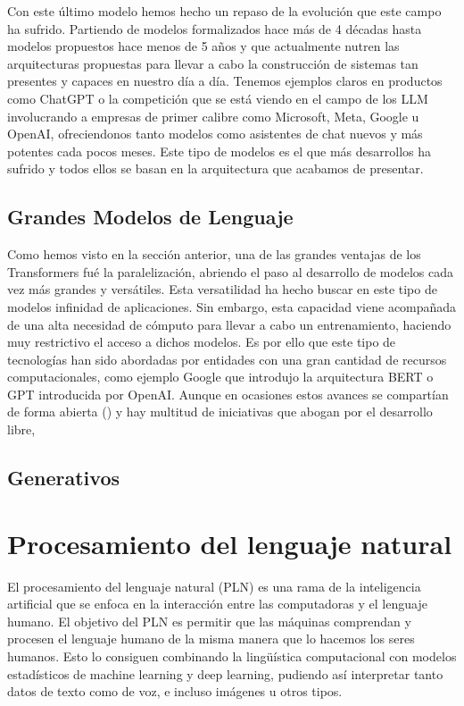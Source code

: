 Con este último modelo hemos hecho un repaso de la evolución que este campo ha sufrido. Partiendo de modelos formalizados hace más de 4 décadas hasta modelos propuestos hace menos de 5 años y que actualmente nutren las arquitecturas propuestas para llevar a cabo la construcción de sistemas tan presentes y capaces en nuestro día a día. Tenemos ejemplos claros en productos como ChatGPT o la competición que se está viendo en el campo de los LLM involucrando a empresas de primer calibre como Microsoft, Meta, Google u OpenAI, ofreciendonos tanto modelos como asistentes de chat nuevos y más potentes cada pocos meses. Este tipo de modelos es el que más desarrollos ha sufrido y todos ellos se basan en la arquitectura que acabamos de presentar.

\subsection{Grandes Modelos de Lenguaje}

Como hemos visto en la sección anterior, una de las grandes ventajas de los Transformers fué la paralelización, abriendo el paso al desarrollo de modelos cada vez más grandes y versátiles. Esta versatilidad ha hecho buscar en este tipo de modelos infinidad de aplicaciones. Sin embargo, esta capacidad viene acompañada de una alta necesidad de cómputo para llevar a cabo un entrenamiento, haciendo muy restrictivo el acceso a dichos modelos. Es por ello que este tipo de tecnologías han sido abordadas por entidades con una gran cantidad de recursos computacionales, como ejemplo Google que introdujo la arquitectura BERT o GPT introducida por OpenAI. Aunque  en ocasiones estos avances se compartían de forma abierta (\cite{touvron2023llama}) y hay multitud de iniciativas que abogan por el desarrollo libre, 

\subsection{Generativos}

\section{Procesamiento del lenguaje natural}

El procesamiento del lenguaje natural (PLN) es una rama de la inteligencia artificial que se enfoca en la interacción entre las computadoras y el lenguaje humano. El objetivo del PLN es permitir que las máquinas comprendan y procesen el lenguaje humano de la misma manera que lo hacemos los seres humanos. Esto lo consiguen combinando la lingüística computacional con modelos estadísticos de machine learning y deep learning, pudiendo así interpretar tanto datos de texto como de voz, e incluso imágenes u otros tipos.

